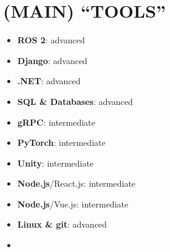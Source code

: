\documentclass[11 pt,oneside,a4paper,titlepage]{article}
\begin{document}
{\begin{minipage}{11.3cm}
        \section*{{\faDesktop} (MAIN) “TOOLS” }
        \vspace*{-0.5cm}
        \begin{multicols}{2}    
        \begin{itemize}
        \footnotesize
            \item \textbf{ROS 2}: advanced
            \item \textbf{Django}: advanced
            \item \textbf{.NET}: advanced
            \item \textbf{SQL \& Databases}: advanced
            \item \textbf{gRPC}: intermediate
            \item \textbf{PyTorch}: intermediate
            \item \textbf{Unity}: intermediate
            \item \textbf{Node.js}/React.js: intermediate    
            \item \textbf{Node.js}/Vue.js: intermediate    
            \item \textbf{Linux \& git}: advanced
            \item[\vspace{\fill}]
        \end{itemize}
        \end{multicols}
        


\end{minipage}}
\end{document}
